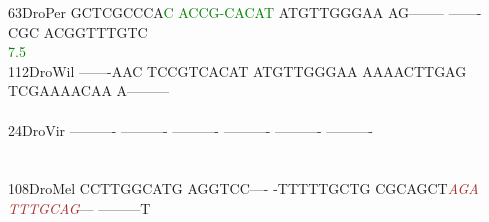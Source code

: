 \documentclass[11pt,twoside,reqno,a4paper]{article}
\begin{document}
{63\hspace*{2\charwidth}DroPer	GCTCGCCCA\textcolor{Green}{C}	\textcolor{Green}{A}\textcolor{Green}{C}\textcolor{Green}{C}\textcolor{Green}{G}\textcolor{Green}{-}\textcolor{Green}{C}\textcolor{Green}{A}\textcolor{Green}{C}\textcolor{Green}{A}\textcolor{Green}{T}	ATGTTGGGAA	AG--------	-------CGC	ACGGTTTGTC	\\
\hspace*{4\charwidth}\hspace*{7\charwidth}\hspace*{9\charwidth}\textcolor{Green}{7.5}\hspace*{1\charwidth}\hspace*{1\charwidth}\hspace*{1\charwidth}\hspace*{1\charwidth}\hspace*{1\charwidth}\hspace*{1\charwidth}\\
112\hspace*{1\charwidth}DroWil	-------AAC	TCCGTCACAT	ATGTTGGGAA	AAAACTTGAG	TCGAAAACAA	A---------	\\
\hspace*{4\charwidth}\hspace*{7\charwidth}\hspace*{1\charwidth}\hspace*{1\charwidth}\hspace*{1\charwidth}\hspace*{1\charwidth}\hspace*{1\charwidth}\hspace*{1\charwidth}\\
24\hspace*{2\charwidth}DroVir	----------	----------	----------	----------	----------	----------	\\
\hspace*{4\charwidth}\hspace*{7\charwidth}\hspace*{1\charwidth}\hspace*{1\charwidth}\hspace*{1\charwidth}\hspace*{1\charwidth}\hspace*{1\charwidth}\hspace*{1\charwidth}\\
\\
108\hspace*{1\charwidth}DroMel	CCTTGGCATG	AGGTCC----	-TTTTTGCTG	CGCAGCT\textit{\textcolor{Brown}{A}}\textit{\textcolor{Brown}{G}}\textit{\textcolor{Brown}{A}}	\textit{\textcolor{Brown}{T}}\textit{\textcolor{Brown}{T}}\textit{\textcolor{Brown}{T}}\textit{\textcolor{Brown}{G}}\textit{\textcolor{Brown}{C}}\textit{\textcolor{Brown}{A}}\textit{\textcolor{Brown}{G}}---	---------T	\\
}
\end{document}
